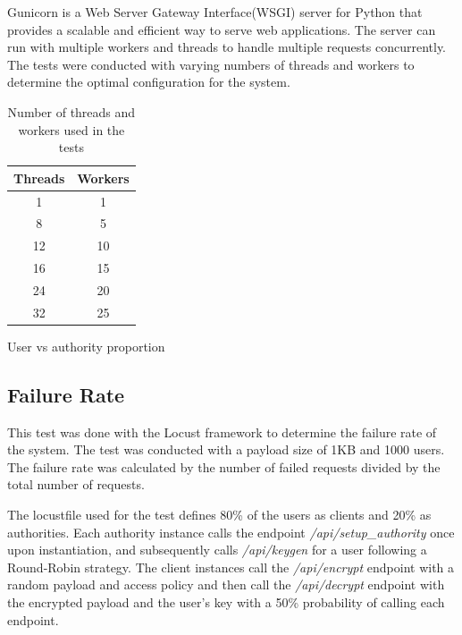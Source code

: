 \documentclass[cic,tc,english]{iiufrgs}
\begin{document}
        Gunicorn is a Web Server Gateway Interface(WSGI) server for Python that provides a scalable and efficient way to serve web applications. The server can run with multiple workers and threads to handle multiple requests concurrently. The tests were conducted with varying numbers of threads and workers to determine the optimal configuration for the system.

        \begin{table}
            \centering
            \begin{tabular}{|c|c|}
                \hline
                \textbf{Threads} & \textbf{Workers} \\ \hline
                1 & 1 \\ \hline
                8 & 5 \\ \hline
                12 & 10 \\ \hline
                16 & 15 \\ \hline
                24 & 20 \\ \hline    
                32 & 25 \\ \hline
            \end{tabular}
            \caption{Number of threads and workers used in the tests}
            \label{tab:threads_workers}
        \end{table}
        
        User vs authority proportion

        \subsection{Failure Rate}
            \label{sec:failurerate}
            This test was done with the Locust framework to determine the failure rate of the system. The test was conducted with a payload size of 1KB and 1000 users. The failure rate was calculated by the number of failed requests divided by the total number of requests.

            The locustfile used for the test defines 80\% of the users as clients and 20\% as authorities. Each authority instance calls the endpoint \emph{/api/setup\_authority} once upon instantiation, and subsequently calls \emph{/api/keygen} for a user following a Round-Robin strategy. The client instances call the \emph{/api/encrypt} endpoint with a random payload and access policy and then call the \emph{/api/decrypt} endpoint with the encrypted payload and the user's key with a 50\% probability of calling each endpoint.
            
\end{document}
